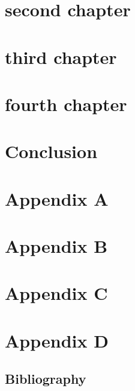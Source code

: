 \documentclass[12pt,letterpaper,oneside,final]{memoir}
\begin{document}
\chapter{second chapter} %
    
\chapter{third chapter} %

\chapter{fourth chapter} %

\chapter[Conclusion]{Conclusion}




\begin{appendices} 
\chapter{Appendix A} %

\chapter{Appendix B} %

\chapter{Appendix C} %

\chapter{Appendix D} %

\end{appendices} 

\newpage

\clearpage

\backmatter


\begin{OnehalfSpace}
\setlength{\bibitemsep}{\onelineskip}

\chapter{Bibliography}

\printindex
\end{OnehalfSpace}
\end{document}
